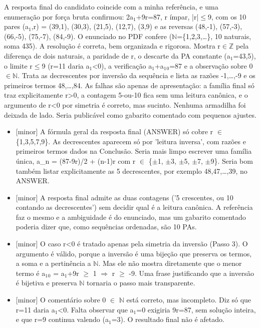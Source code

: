 \documentclass{article}%
\begin{document}
A resposta final do candidato coincide com a minha referência, e uma enumeração por força bruta confirmou: 2a$_{1}$+9r=87, r ímpar, |r|$\leq$9, com os 10 pares (a$_{1}$,r) = (39,1), (30,3), (21,5), (12,7), (3,9) e as reversas (48,-1), (57,-3), (66,-5), (75,-7), (84,-9). O enunciado no PDF confere ($\mathbb{N}$=\{1,2,3,\ldots{}\}, 10 naturais, soma 435). A resolução é correta, bem organizada e rigorosa. Mostra r$\in$$\mathbb{Z}$ pela diferença de dois naturais, a paridade de r, o descarte da PA constante (a$_{1}$=43,5), o limite r$\leq$9 (r=11 daria a$_{1}$<0), a verificação a$_{1}$+a$_{1}$$_{0}$=87 e a observação sobre 0$\in$$\mathbb{N}$. Trata as decrescentes por inversão da sequência e lista as razões -1,\ldots{},-9 e os primeiros termos 48,\ldots{},84. As falhas são apenas de apresentação: a família final só traz explicitamente r>0, a contagem 5{-}ou{-}10 fica sem uma leitura canônica, e o argumento de r<0 por simetria é correto, mas sucinto. Nenhuma armadilha foi deixada de lado. Seria publicável como gabarito comentado com pequenos ajustes.%
\begin{itemize}%
\item%
{[}minor{]} A fórmula geral da resposta final (ANSWER) só cobre r $\in$ \{1,3,5,7,9\}. As decrescentes aparecem só por 'leitura inversa', com razões e primeiros termos dados na Conclusão. Seria mais limpo escrever uma família única, a\_n = (87-9r)/2 + (n-1)r com r $\in$ \{$\pm$1, $\pm$3, $\pm$5, $\pm$7, $\pm$9\}. Seria bom também listar explicitamente as 5 decrescentes, por exemplo 48,47,\ldots{},39, no ANSWER.%
\item%
{[}minor{]} A resposta final admite as duas contagens ('5 crescentes, ou 10 contando as decrescentes') sem decidir qual é a leitura canônica. A referência faz o mesmo e a ambiguidade é do enunciado, mas um gabarito comentado poderia dizer que, como sequências ordenadas, são 10 PAs.%
\item%
{[}minor{]} O caso r<0 é tratado apenas pela simetria da inversão (Passo 3). O argumento é válido, porque a inversão é uma bijeção que preserva os termos, a soma e a pertinência a $\mathbb{N}$. Mas ele não mostra diretamente que o menor termo é a$_{1}$$_{0}$ = a$_{1}$+9r $\geq$ 1 $\Rightarrow$ r $\geq$ -9. Uma frase justificando que a inversão é bijetiva e preserva $\mathbb{N}$ tornaria o passo mais transparente.%
\item%
{[}minor{]} O comentário sobre 0 $\in$ $\mathbb{N}$ está correto, mas incompleto. Diz só que r=11 daria a$_{1}$<0. Falta observar que a$_{1}$=0 exigiria 9r=87, sem solução inteira, e que r=9 continua valendo (a$_{1}$=3). O resultado final não é afetado.%
\end{itemize}%
\end{document}
